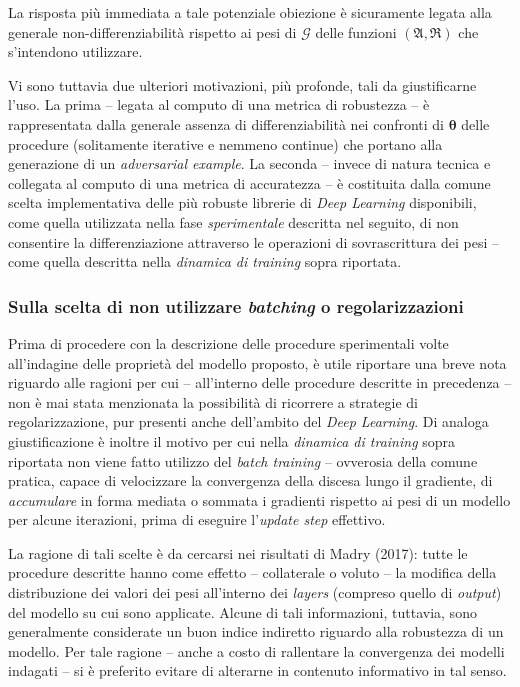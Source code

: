 \documentclass[a4paper, twoside]{article}
\begin{document}
La risposta più immediata a tale potenziale obiezione è sicuramente legata alla generale non-differenziabilità rispetto ai pesi di $\mathcal{G}$ delle funzioni $({\mathfrak{A}},{\mathfrak{R}})$ che s'intendono utilizzare.

Vi sono tuttavia due ulteriori motivazioni, più profonde, tali da giustificarne l'uso. La prima -- legata al computo di una metrica di robustezza -- è rappresentata dalla generale assenza di differenziabilità nei confronti di $\boldsymbol{\theta}$ delle procedure (solitamente iterative e nemmeno continue) che portano alla generazione di un \textit{adversarial example}. La seconda -- invece di natura tecnica e collegata al computo di una metrica di accuratezza -- è costituita dalla comune scelta implementativa delle più robuste librerie di \textit{Deep Learning} disponibili, come quella utilizzata nella fase \textit{sperimentale} descritta nel seguito, di non consentire la differenziazione attraverso le operazioni di sovrascrittura dei pesi -- come quella descritta nella \textit{dinamica di training} sopra riportata.


\subsubsection{Sulla scelta di non utilizzare \textit{batching} o regolarizzazioni}

Prima di procedere con la descrizione delle procedure sperimentali volte all'indagine delle proprietà del modello proposto, è utile riportare una breve nota riguardo alle ragioni per cui -- all'interno delle procedure descritte in precedenza -- non è mai stata menzionata la possibilità di ricorrere a strategie di regolarizzazione, pur presenti anche dell'ambito del \textit{Deep Learning}. Di analoga giustificazione è inoltre il motivo per cui nella \textit{dinamica di training} sopra riportata non viene fatto utilizzo del \textit{batch training} -- ovverosia della comune pratica, capace di velocizzare la convergenza della discesa lungo il gradiente, di \textit{accumulare} in forma mediata o sommata i gradienti rispetto ai pesi di un modello per alcune iterazioni, prima di eseguire l'\textit{update step} effettivo.

La ragione di tali scelte è da cercarsi nei risultati di Madry (2017): tutte le procedure descritte hanno come effetto -- collaterale o voluto -- la modifica della distribuzione dei valori dei pesi all'interno dei \textit{layers} (compreso quello di \textit{output}) del modello su cui sono applicate. Alcune di tali informazioni, tuttavia, sono generalmente considerate un buon indice indiretto riguardo alla robustezza di un modello. Per tale ragione -- anche a costo di rallentare la convergenza dei modelli indagati -- si è preferito evitare di alterarne in contenuto informativo in tal senso.
\end{document}
